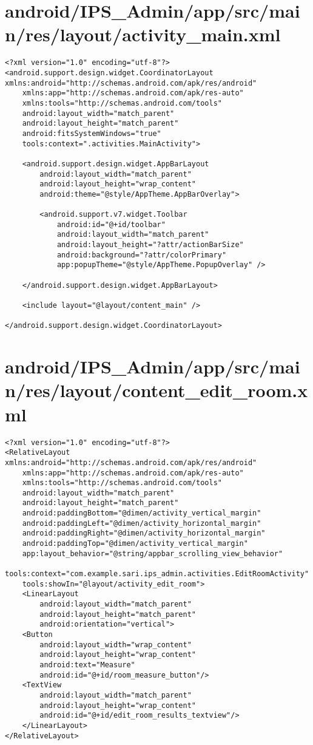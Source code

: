 \section{android/IPS\_Admin/app/src/main/res/layout/activity_main.xml}
\begin{lstlisting}<?xml version="1.0" encoding="utf-8"?>
<android.support.design.widget.CoordinatorLayout xmlns:android="http://schemas.android.com/apk/res/android"
    xmlns:app="http://schemas.android.com/apk/res-auto"
    xmlns:tools="http://schemas.android.com/tools"
    android:layout_width="match_parent"
    android:layout_height="match_parent"
    android:fitsSystemWindows="true"
    tools:context=".activities.MainActivity">

    <android.support.design.widget.AppBarLayout
        android:layout_width="match_parent"
        android:layout_height="wrap_content"
        android:theme="@style/AppTheme.AppBarOverlay">

        <android.support.v7.widget.Toolbar
            android:id="@+id/toolbar"
            android:layout_width="match_parent"
            android:layout_height="?attr/actionBarSize"
            android:background="?attr/colorPrimary"
            app:popupTheme="@style/AppTheme.PopupOverlay" />

    </android.support.design.widget.AppBarLayout>

    <include layout="@layout/content_main" />

</android.support.design.widget.CoordinatorLayout>
\end{lstlisting}
\newpage
\section{android/IPS\_Admin/app/src/main/res/layout/content_edit_room.xml}
\begin{lstlisting}<?xml version="1.0" encoding="utf-8"?>
<RelativeLayout xmlns:android="http://schemas.android.com/apk/res/android"
    xmlns:app="http://schemas.android.com/apk/res-auto"
    xmlns:tools="http://schemas.android.com/tools"
    android:layout_width="match_parent"
    android:layout_height="match_parent"
    android:paddingBottom="@dimen/activity_vertical_margin"
    android:paddingLeft="@dimen/activity_horizontal_margin"
    android:paddingRight="@dimen/activity_horizontal_margin"
    android:paddingTop="@dimen/activity_vertical_margin"
    app:layout_behavior="@string/appbar_scrolling_view_behavior"
    tools:context="com.example.sari.ips_admin.activities.EditRoomActivity"
    tools:showIn="@layout/activity_edit_room">
    <LinearLayout
        android:layout_width="match_parent"
        android:layout_height="match_parent"
        android:orientation="vertical">
    <Button
        android:layout_width="wrap_content"
        android:layout_height="wrap_content"
        android:text="Measure"
        android:id="@+id/room_measure_button"/>
    <TextView
        android:layout_width="match_parent"
        android:layout_height="wrap_content"
        android:id="@+id/edit_room_results_textview"/>
    </LinearLayout>
</RelativeLayout>
\end{lstlisting}
\newpage

